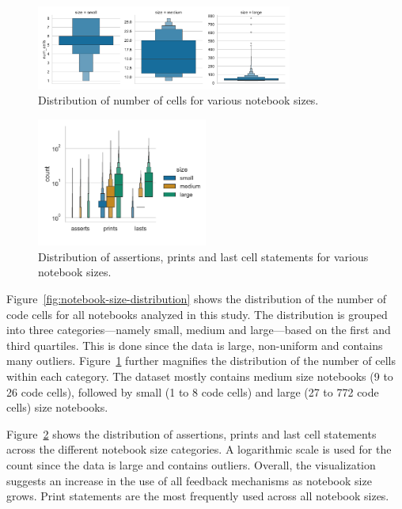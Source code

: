 \documentclass[smallextended]{svjour3}       %
\begin{document}
\begin{figure}
  \centering
  \includegraphics[width=0.75\textwidth]{cell-per-notebook-size-distribution.pdf}
  \caption{Distribution of number of cells for various notebook sizes.}
  \label{fig:cell-per-notebook-size-distribution.pdf}
\end{figure}

\begin{figure}
  \centering
  \includegraphics[width=0.5\textwidth]{fms-per-notebook-size-distribution.pdf}
  \caption{Distribution of assertions, prints and last cell statements for various notebook sizes.}
  \label{fig:fms-per-notebook-size-distribution}
\end{figure}

Figure~\ref{fig:notebook-size-distribution} shows the distribution of the number of code cells for all notebooks analyzed in this study. The distribution is grouped into three categories---namely small, medium and large---based on the first and third quartiles. This is done since the data is large, non-uniform and contains many outliers. Figure~\ref{fig:cell-per-notebook-size-distribution.pdf} further magnifies the distribution of the number of cells within each category. The dataset mostly contains medium size notebooks (9 to 26 code cells), followed by small (1 to 8 code cells) and large (27 to 772 code cells) size notebooks.

Figure~\ref{fig:fms-per-notebook-size-distribution} shows the distribution of assertions, prints and last cell statements across the different notebook size categories. A logarithmic scale is used for the count since the data is large and contains outliers. Overall, the visualization suggests an increase in the use of all feedback mechanisms as notebook size grows. Print statements are the most frequently used across all notebook sizes.
\end{document}
